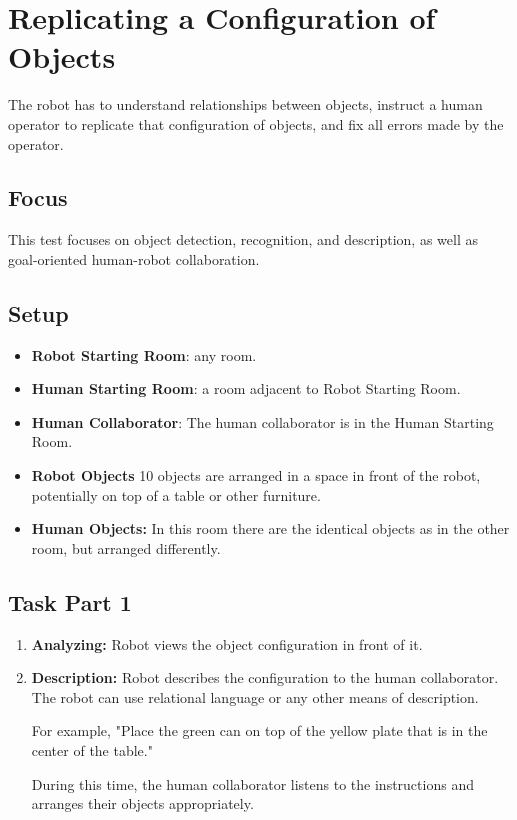 \section{Replicating a Configuration of Objects}

The robot has to understand relationships between objects, instruct a human operator to replicate that configuration of objects, and fix all errors made by the operator.

\subsection{Focus}

This test focuses on object detection, recognition, and description, as well as goal-oriented human-robot collaboration.

\subsection{Setup}
\begin{itemize}
	\item \textbf{Robot Starting Room}: any room.
	\item \textbf{Human Starting Room}: a room adjacent to Robot Starting Room.
	\item \textbf{Human Collaborator}: The human collaborator is in the Human Starting Room.
	\item \textbf{Robot Objects} 10 objects are arranged in a space in front of the robot, potentially on top of a table or other furniture.
	\item \textbf{Human Objects:} In this room there are the identical objects as in the other room, but arranged differently.
\end{itemize}

\subsection{Task Part 1}

\begin{enumerate}

	\item \textbf{Analyzing:} Robot views the object configuration in front of it.

	\item \textbf{Description:} Robot describes the configuration to the human collaborator.  The robot can use relational language or any other means of description.

	For example, "Place the green can on top of the yellow plate that is in the center of the table."

	During this time, the human collaborator listens to the instructions and arranges their objects appropriately.

\end{enumerate}

